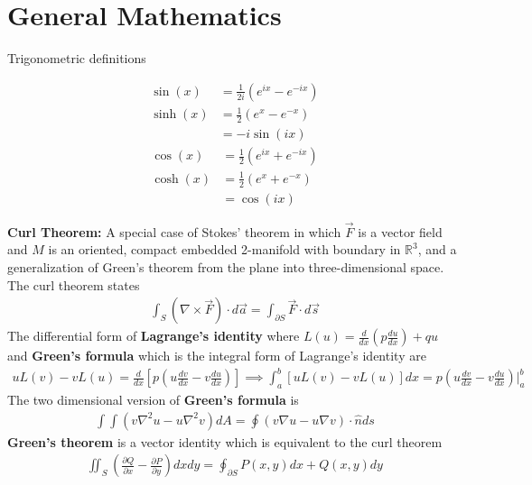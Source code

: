 \chapter{General Mathematics}
\thispagestyle{fancy}
Trigonometric definitions
\begin{multicols}{2}
	\noindent
	\begin{align}
	\sin(x) &=\frac{1}{2i}(e^{ix}-e^{-ix}) \\
	\sinh(x) &= \frac{1}{2}(e^{x}-e^{-x}) \\
	&= -i\sin(ix)
	\end{align}
	\begin{align}
	\cos(x) &=\frac{1}{2}(e^{ix}+e^{-ix}) \\
	\cosh(x) &=\frac{1}{2}(e^{x}+e^{-x}) \\
	&= \cos(ix)
	\end{align}
\end{multicols}
\textbf{Curl Theorem:} A special case of Stokes' theorem in which $\vec{F}$ is a vector field and $M$ is an oriented, compact embedded 2-manifold with boundary in $\mathbb{R}^3$, and a generalization of Green's theorem from the plane into three-dimensional space. The curl theorem states 
\begin{align}
	\int_S (\nabla \times \vec{F})\cdot d\vec{a} = \int_{\partial S}\vec{F} \cdot d\vec{s}
\end{align}
The differential form of \textbf{Lagrange's identity} where $L(u)=\frac{d}{dx}(p\frac{du}{dx})+qu$ and \textbf{Green's formula} which is the integral form of Lagrange's identity \cite{bib:PDE book} are
\begin{align}
uL(v) - v L(u) = \frac{d}{dx}\left[p\left(u\frac{dv}{dx}-v\frac{du}{dx}\right)\right] \implies \int_{a}^{b} [uL(v) - v L(u)] dx = p\left(u\frac{dv}{dx}-v\frac{du}{dx}\right)\Big|_a^b
\end{align}
The two dimensional version of \textbf{Green's formula} \cite{bib:PDE book} is 
\begin{align}
\int \int (v\nabla^2 u - u \nabla^2 v)dA = \oint (v\nabla u - u \nabla v) \cdot \hat{n} ds
\end{align}
\textbf{Green's theorem} is a vector identity which is equivalent to the curl theorem 
\begin{align}
	\iint_S \left(\frac{\partial Q}{\partial x}-\frac{\partial P}{\partial y}\right) dxdy = \oint_{\partial S} P(x,y)dx+Q(x,y)dy
\end{align}
